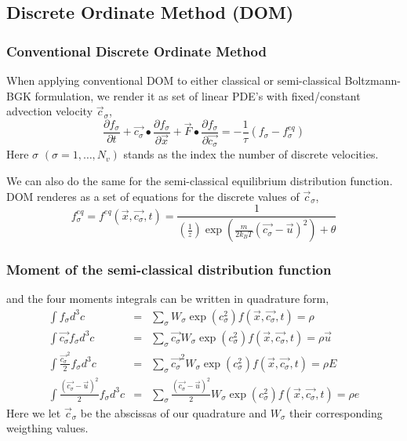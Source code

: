 \subsection{Discrete Ordinate Method (DOM)}
\begin{frame}
	\frametitle{Conventional Discrete Ordinate Method}
	When applying conventional DOM to either classical or semi-classical Boltzmann-BGK formulation, we render it as set of linear PDE's with fixed/constant advection velocity $\vec{c}_\sigma$,
	\begin{equation}
	\frac{\partial{f_\sigma}}{\partial{t}} +
	\vec{c_\sigma}\bullet\frac{\partial{f_\sigma}}{\partial{\vec{x}}} +
	\vec{F}\bullet\frac{\partial{f_\sigma}}{\partial{\vec{c_\sigma}}} = 
	-\frac{1}{\tau}(f_\sigma-f^{eq}_\sigma)
	\end{equation}
Here $\sigma$ $(\sigma = 1,\dots,N_v)$ stands as the index the number of discrete velocities. 
\end{frame}

\begin{frame}
We can also do the same for the semi-classical equilibrium distribution function. DOM renderes as a set of equations for the discrete values of $\vec{c}_\sigma$,
	\begin{equation}
	f_\sigma^{eq}=f^{eq}(\vec{x},\vec{c_\sigma},t)=\frac{1}{(\frac{1}{z})\exp\left({\frac{m}{2 k_B T}(\vec{c_\sigma}-\vec{u})^2}\right)+\theta}
	\end{equation}
\end{frame}

\begin{frame}
	\frametitle{Moment of the semi-classical distribution function}
	and the four moments integrals can be written in quadrature form, 
	\begin{eqnarray}
	\int f_\sigma d^3 c &=& \sum_\sigma W_\sigma \exp{(c_\sigma^2)} f(\vec{x},\vec{c_\sigma},t) = \rho \\
	\int \vec{c_\sigma} f_\sigma d^3 c &=& \sum_\sigma \vec{c_\sigma} W_\sigma \exp{(c_\sigma^2)} f(\vec{x},\vec{c_\sigma},t) = \rho \vec{u} \nonumber \\
	\int \frac{\vec{c_\sigma}^2}{2} f_\sigma d^3 c &=& \sum_\sigma \vec{c_\sigma}^2 W_\sigma \exp{(c_\sigma^2)} f(\vec{x},\vec{c_\sigma},t) = \rho E \nonumber \\
	\int \frac{(\vec{c_\sigma}-\vec{u})^2}{2} f_\sigma d^3 c &=& \sum_\sigma \frac{(\vec{c_\sigma}-\vec{u})^2}{2} W_\sigma \exp{(c_\sigma^2)} f(\vec{x},\vec{c_\sigma},t) = \rho e \nonumber
	\end{eqnarray}
	Here we let $\vec{c}_\sigma$ be the abscissas of our quadrature and $W_\sigma$ their corresponding weigthing values. 
\end{frame} 

